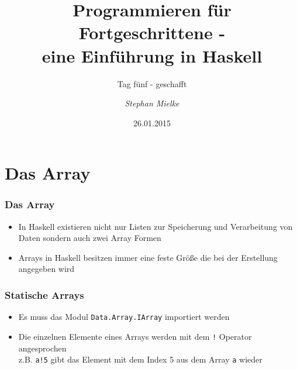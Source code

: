 \documentclass[fleqn,11pt,aspectratio=43]{beamer}
\title{Programmieren für Fortgeschrittene - \\eine Einführung in Haskell}
\author[Stephan Mielke]{\emph{Stephan Mielke}}
\institute[TU Braunschweig, IPS]{Technische Universität Braunschweig, IPS}
\begin{document}
\subtitle{Tag fünf - geschafft} 
\date{26.01.2015}

\begin{frame}[plain]
\titlepage
\end{frame}

\section{Das Array}
\begin{frame}
\frametitle{Das Array}
\begin{block}{\vspace*{-3ex}}
\begin{itemize}
	\item In Haskell existieren nicht nur Listen zur Speicherung und Verarbeitung von Daten sondern auch zwei Array Formen
	\item Arrays in Haskell besitzen immer eine feste Größe die bei der Erstellung angegeben wird
\end{itemize}
\end{block}
\end{frame}

\begin{frame}
\frametitle{Statische Arrays}
\begin{block}{\vspace*{-3ex}}
\begin{itemize}
	\item Es muss das Modul \lstinline|Data.Array.IArray| importiert werden
	\item Die einzelnen Elemente eines Arrays werden mit dem \lstinline|!| Operator angesprochen\\ z.B. \lstinline|a!5| gibt das Element mit dem Index 5 aus dem Array \lstinline|a| wieder 
\end{itemize}
\end{block}
\end{frame}
\end{document}
